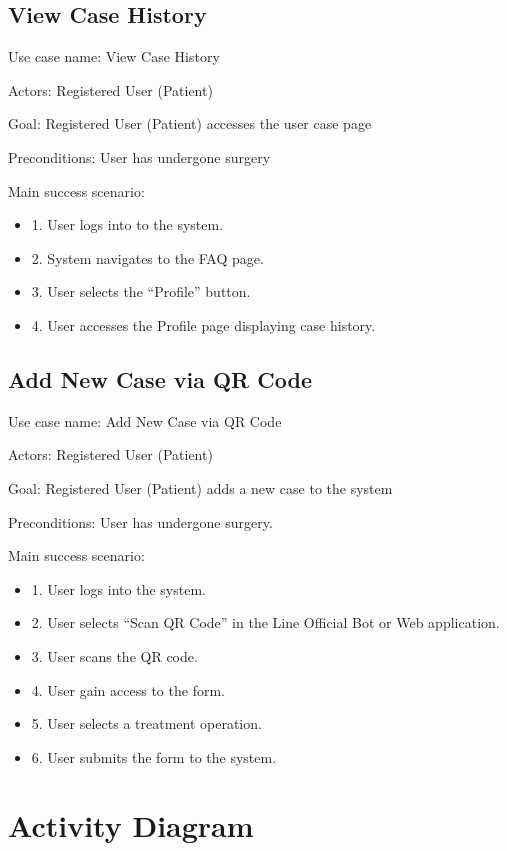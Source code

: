 \documentclass[12pt,oneside,openright,a4paper]{cpe-english-project}
\begin{document}
      \subsection{View Case History}
        \qquad Use case name: View Case History \par
        \qquad Actors: Registered User (Patient) \par
        \qquad Goal: Registered User (Patient) accesses the user case page \par
        \qquad Preconditions: User has undergone surgery \par
        \qquad Main success scenario:
        \begin{itemize}
          \item[] 1. User logs into to the system.
          \item[] 2. System navigates to the FAQ page.
          \item[] 3. User selects the “Profile” button.
          \item[] 4. User accesses the Profile page displaying case history.
        \end{itemize}

      \subsection{Add New Case via QR Code}
        \qquad Use case name: Add New Case via QR Code \par
        \qquad Actors: Registered User (Patient) \par
        \qquad Goal: Registered User (Patient) adds a new case to the system\par
        \qquad Preconditions: User has undergone surgery. \par
        \qquad Main success scenario:
        \begin{itemize}
          \item[] 1. User logs into the system.
          \item[] 2. User selects “Scan QR Code” in the Line Official Bot or Web application.
          \item[] 3. User scans the QR code.
          \item[] 4. User gain access to the form.
          \item[] 5. User selects a treatment operation.
          \item[] 6. User submits the form to the system.
        \end{itemize}
    \section{Activity Diagram}
\end{document}
